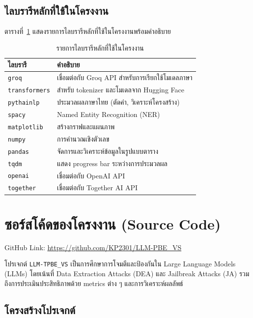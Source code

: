 \section{ไลบรารีหลักที่ใช้ในโครงงาน}
\label{sec:main-libraries}

ตารางที่~\ref{tab:libraries} แสดงรายการไลบรารีหลักที่ใช้ในโครงงานพร้อมคำอธิบาย

\begin{table}[htbp]
\centering
\caption{รายการไลบรารีหลักที่ใช้ในโครงงาน}
\label{tab:libraries}
\begin{tabular}{|l|p{9cm}|}
\hline
\textbf{ไลบรารี} & \textbf{คำอธิบาย} \\
\hline
\texttt{groq} & เชื่อมต่อกับ Groq API สำหรับการเรียกใช้โมเดลภาษา \\
\hline
\texttt{transformers} & สำหรับ tokenizer และโมเดลจาก Hugging Face \\
\hline
\texttt{pythainlp} & ประมวลผลภาษาไทย (ตัดคำ, วิเคราะห์โครงสร้าง) \\
\hline
\texttt{spacy} & Named Entity Recognition (NER) \\
\hline
\texttt{matplotlib} & สร้างกราฟและแผนภาพ \\
\hline
\texttt{numpy} & การคำนวณเชิงตัวเลข \\
\hline
\texttt{pandas} & จัดการและวิเคราะห์ข้อมูลในรูปแบบตาราง \\
\hline
\texttt{tqdm} & แสดง progress bar ระหว่างการประมวลผล \\
\hline
\texttt{openai} & เชื่อมต่อกับ OpenAI API \\
\hline
\texttt{together} & เชื่อมต่อกับ Together AI API \\
\hline
\end{tabular}
\end{table}


\chapter{ซอร์สโค้ดของโครงงาน (Source Code)}
\label{ch:source-code}
GitHub Link: \url{https://github.com/KP2301/LLM-PBE_VS}

โปรเจกต์ \texttt{LLM-TPBE\_VS} เป็นการศึกษาการโจมตีและป้องกันใน Large Language Models (LLMs) โดยเน้นที่ Data Extraction Attacks (DEA) และ Jailbreak Attacks (JA) รวมถึงการประเมินประสิทธิภาพด้วย metrics ต่าง ๆ และการวิเคราะห์ผลลัพธ์

\section{โครงสร้างโปรเจกต์}
\label{sec:project-structure}


